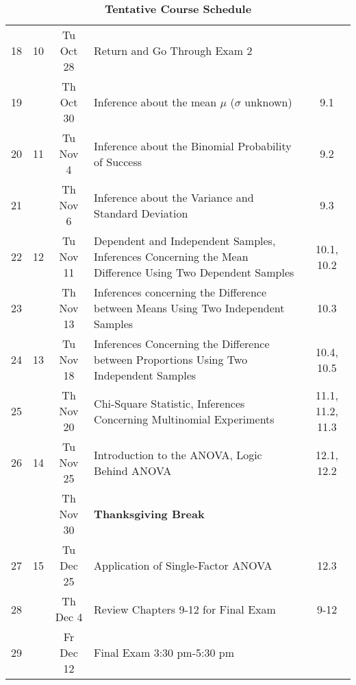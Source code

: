 \documentclass[10pt]{article}
\begin{document}
\begin{description}
\begin{table}[]
\begin{tabular}{|c|c|c|p{9cm}|c|}
\hline
18 & 10 & Tu Oct 28 & Return and Go Through Exam 2 &  \\
19 & &Th Oct 30 & Inference about the mean $\mu$ ($\sigma$ unknown) & 9.1 \\
\hline
20 & 11 & Tu Nov 4 & Inference about the Binomial Probability of Success & 9.2 \\
21 & &Th Nov 6 & Inference about the Variance and Standard Deviation & 9.3 \\
\hline
22 & 12 & Tu Nov 11 & Dependent and Independent Samples, Inferences Concerning the Mean Difference Using Two Dependent Samples & 10.1, 10.2 \\
23 & &Th Nov 13 & Inferences concerning the Difference between Means Using Two Independent Samples & 10.3 \\
\hline
24 & 13 & Tu Nov 18 & Inferences Concerning the Difference between Proportions Using Two Independent Samples & 10.4, 10.5 \\
25 & & Th Nov 20 & Chi-Square Statistic, Inferences Concerning Multinomial Experiments & 11.1, 11.2, 11.3 \\
\hline
26 & 14 & Tu Nov 25 & Introduction to the ANOVA, Logic Behind ANOVA & 12.1, 12.2 \\
& &Th Nov 30 & \centering\textbf{Thanksgiving Break} & \\
\hline
27 & 15 & Tu Dec 25 & Application of Single-Factor ANOVA & 12.3 \\
28 & &Th Dec 4 & Review Chapters 9-12 for Final Exam & 9-12 \\
\hline
29 & &Fr Dec 12 & Final Exam 3:30 pm-5:30 pm & \\
\hline
\end{tabular}
\caption{\bf{\color{red}Tentative} Course Schedule}

\label{tab:schedule}
\end{table}

\end{description}
\end{document}
